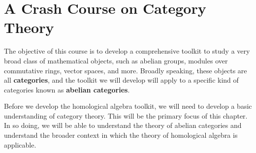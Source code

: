 \chapter{A Crash Course on Category Theory}\label{Ch1:CH}
\thispagestyle{empty}

The objective of this course is to develop a comprehensive toolkit to study a very broad class of mathematical objects, such as abelian groups, modules over commutative rings, vector spaces, and more. Broadly speaking, these objects are all \textbf{categories}, and the toolkit we will develop will apply to a specific kind of categories known as \textbf{abelian categories}.

Before we develop the homological algebra toolkit, we will need to develop a basic understanding of category theory. This will be the primary focus of this chapter. In so doing, we will be able to understand the theory of abelian categories and understand the broader context in which the theory of homological algebra is applicable.





